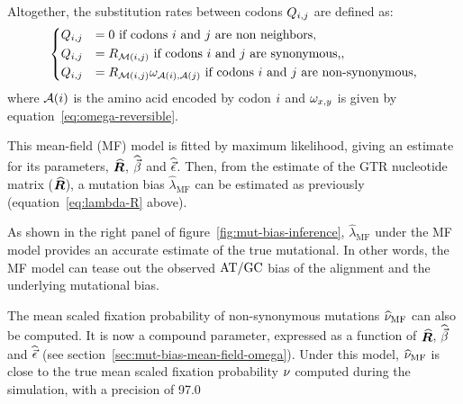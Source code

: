 Altogether, the substitution rates between codons $Q_{{i}, {j}}$ are defined as:
\begin{equation}
    \begin{dcases}
        Q_{{i}, {j}} & = 0 \text{ if codons ${i}$ and ${j}$ are non neighbors}, \\
        Q_{{i}, {j}} & = R_{\mathcal{M}({i}, {j})} \text{ if codons ${i}$ and ${j}$ are synonymous,}, \\
        Q_{{i}, {j}} & = R_{\mathcal{M}({i}, {j})} \omega_{\mathcal{A}({i}), \mathcal{A}({j})} \text{ if codons ${i}$ and ${j}$ are non-synonymous},
    \end{dcases}
    \label{eq:codon-mean-field}
\end{equation}
where $\mathcal{A}({i})$ is the amino acid encoded by codon ${i}$ and $\omega_{x, y}$ is given by equation~\ref{eq:omega-reversible}.

This mean-field (MF) model is fitted by maximum likelihood, giving an estimate for its parameters, $\widehat{\bm{R}}$, $\widehat{\vec{\beta}}$ and $\widehat{\vec{\epsilon}}$.
Then, from the estimate of the GTR nucleotide matrix ($\widehat{\bm{R}}$), a mutation bias $\widehat{\lambda}_{\text{MF}}$ can be estimated as previously (equation~\ref{eq:lambda-R} above).

As shown in the right panel of figure~\ref{fig:mut-bias-inference}, $\widehat{\lambda}_{\text{MF}}$ under the MF model provides an accurate estimate of the true mutational.
In other words, the MF model can tease out the observed $\text{AT/GC}$ bias of the alignment and the underlying mutational bias.

The mean scaled fixation probability of non-synonymous mutations $\widehat{\nu}_{\text{MF}}$ can also be computed.
It is now a compound parameter, expressed as a function of $\widehat{\bm{R}}$, $\widehat{\vec{\beta}}$ and $\widehat{\vec{\epsilon}}$ (see section~\ref{sec:mut-bias-mean-field-omega}).
Under this model, $\widehat{\nu}_{\text{MF}}$ is close to the true mean scaled fixation probability $\nu$ computed during the simulation, with a precision of 97.0%

